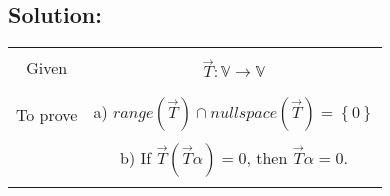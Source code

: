 \documentclass[journal,12pt,twocolumn]{IEEEtran}
\begin{document}
\subsection*{Solution:}
\begin{table}[h!]
\begin{center}
\begin{tabular}{|c|c|}
\hline
& \\
Given & $\vec{T}:\mathbb{V} \rightarrow \mathbb{V}$\\
&\\
\hline
& \\
To prove & a) $ range(\vec{T}) \cap null space(\vec{T}) = \left\lbrace 0 \right\rbrace$\\
& \\
& b) If $\vec{T}(\vec{T}\alpha) = 0$, then $\vec{T}\alpha = 0$.\\
& \\
\hline
\end{tabular}
\end{center}
\end{table}
\end{document}
